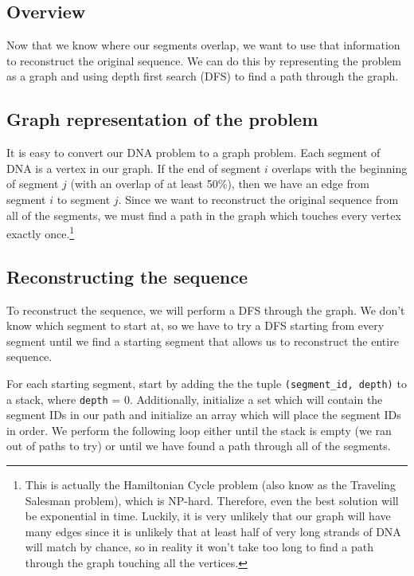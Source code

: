 \documentclass{article}
\begin{document}
\subsection{Overview}

Now that we know where our segments overlap, we want to use that information to reconstruct the original sequence. We can do this by representing the problem as a graph and using depth first search (DFS) to find a path through the graph.

\subsection{Graph representation of the problem}

It is easy to convert our DNA problem to a graph problem. Each segment of DNA is a vertex in our graph. If the end of segment $i$ overlaps with the beginning of segment $j$ (with an overlap of at least 50\%), then we have an edge from segment $i$ to segment $j$. Since we want to reconstruct the original sequence from all of the segments, we must find a path in the graph which touches every vertex exactly once.\footnote{This is actually the Hamiltonian Cycle problem (also know as the Traveling Salesman problem), which is NP-hard. Therefore, even the best solution will be exponential in time. Luckily, it is very unlikely that our graph will have many edges since it is unlikely that at least half of very long strands of DNA will match by chance, so in reality it won't take too long to find a path through the graph touching all the vertices.}

\subsection{Reconstructing the sequence}

To reconstruct the sequence, we will perform a DFS through the graph. We don't know which segment to start at, so we have to try a DFS starting from every segment until we find a starting segment that allows us to reconstruct the entire sequence.

For each starting segment, start by adding the the tuple \texttt{(segment\_id, depth)} to a stack, where \texttt{depth} = 0. Additionally, initialize a set which will contain the segment IDs in our path and initialize an array which will place the segment IDs in order. We perform the following loop either until the stack is empty (we ran out of paths to try) or until we have found a path through all of the segments.
\end{document}
